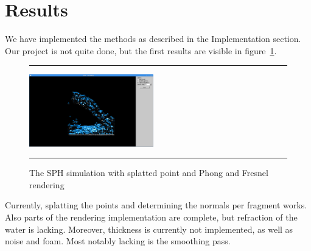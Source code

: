 \section{Results}
We have implemented the methods as described in the Implementation section.
Our project is not quite done, but the first results are visible in figure~\ref{fig:res}.

\begin{figure}[!th]
\hrule
\begin{center}
\vspace*{2ex}\includegraphics[width=0.48\textwidth,clip=true,trim=10cm 3cm 10cm 3cm]{pictures/colors.png}
\end{center}
\caption{The SPH simulation with splatted point and Phong and Fresnel rendering}
\label{fig:res} 
\vspace*{2ex}
\hrule
\end{figure}

Currently, splatting the points and determining the normals per fragment works. Also parts of the rendering implementation are complete, but refraction of the water is lacking.
Moreover, thickness is currently not implemented, as well as noise and foam.
Most notably lacking is the smoothing pass. 
